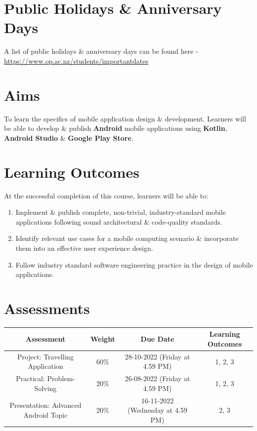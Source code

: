 \documentclass{article}
\begin{document}
\section*{Public Holidays \& Anniversary Days}
A list of public holidays \& anniversary days can be found here - \href{https://www.op.ac.nz/students/importantdates}{https://www.op.ac.nz/students/importantdates}

\section*{Aims}
To learn the specifics of mobile application design \& development. Learners will be able to develop \& publish \textbf{Android} mobile applications using \textbf{Kotlin}, \textbf{Android Studio} \& \textbf{Google Play Store}.

\section*{Learning Outcomes}
At the successful completion of this course, learners will be able to:
\begin{enumerate}
	\item Implement \& publish complete, non-trivial, industry-standard mobile applications following sound architectural \& code-quality standards.
	\item Identify relevant use cases for a mobile computing scenario \& incorporate them into an effective user experience design.
	\item Follow industry standard software engineering practice in the design of mobile applications.
\end{enumerate} 

\section*{Assessments}
\renewcommand{\arraystretch}{1.5}
\begin{tabular}{|c|c|c|c|}
	\hline
	\textbf{Assessment} & \textbf{Weight} & \textbf{Due Date}    & \textbf{Learning Outcomes} \\ \hline
	Project: Travelling Application             & 60\%            & 28-10-2022 (Friday at 4.59 PM)  & 1, 2, 3                    \\ \hline
	Practical: Problem-Solving          & 20\%            & 26-08-2022 (Friday at 4.59 PM) & 1, 2, 3                    \\ \hline
	Presentation: Advanced Android Topic        & 20\%            & 16-11-2022 (Wednesday at 4.59 PM) & 2, 3                       \\ \hline
\end{tabular}
\end{document}

